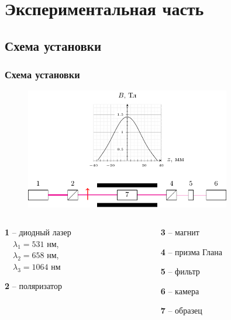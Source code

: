 \documentclass[10pt,pdf,hyperref={unicode}, dvipsnames]{beamer}
\begin{document}
\section{Экспериментальная часть}
\subsection{Схема установки}
\begin{frame}
	\frametitle{Схема установки}
	\begin{figure}[tb]
		\centering
		\includegraphics[width=0.8\textwidth]{img/chem}
	\end{figure}
	\begin{columns}
		\hspace{2.5cm}
		\begin{column}{0.3\textwidth}
			
			
			\textbf{1} -- диодный лазер\\ 
			$\quad\lambda_1=531$ нм,\\
			$\quad\lambda_2=658$ нм,\\
			$\quad\lambda_3=1064$ нм
			
			
			\textbf{2} -- поляризатор
			
		\end{column}
		\hspace{1.6cm}
		\begin{column}{0.7\textwidth}
			
			\textbf{3} -- магнит
			
			\textbf{4} -- призма Глана
			
			\textbf{5} -- фильтр
			
			\textbf{6} -- камера
			
			\textbf{7} -- образец
		\end{column}
	\end{columns}
	
\end{frame}
\end{document}
